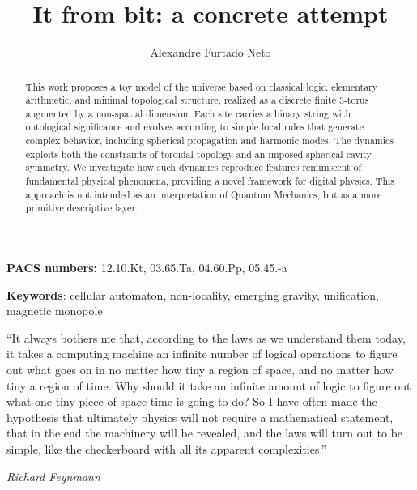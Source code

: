 \documentclass{ijuc}
\begin{document}
\title{It from bit: a concrete attempt}

\author{Alexandre Furtado Neto
}


\def\received{\today}

\maketitle

\begin{abstract}
\sloppy
This work proposes a toy model of the universe based on classical logic, elementary arithmetic, and minimal topological structure, realized as a discrete finite 3-torus augmented by a non-spatial dimension. Each site carries a binary string with ontological significance and evolves according to simple local rules that generate complex behavior, including spherical propagation and harmonic modes. The dynamics exploits both the constraints of toroidal topology and an imposed spherical cavity symmetry. We investigate how such dynamics reproduce features reminiscent of fundamental physical phenomena, providing a novel framework for digital physics. This approach is not intended as an interpretation of Quantum Mechanics, but as a more primitive descriptive layer.

\medskip{}
\end{abstract}

\vfill

\begin{center}
\textbf{PACS numbers: }12.10.Kt, 03.65.Ta, 04.60.Pp, 05.45.-a
\par\end{center}

\begin{center}
\textbf{Keywords}: cellular automaton, non-locality, emerging gravity, unification, magnetic monopole
\par\end{center}

\newpage


\epigraph{``It always bothers me that, according to the laws as we understand them today, it takes a computing machine an infinite number of logical operations to figure out what goes on in no matter how tiny a region of space, and no matter how tiny a region of time. Why should it take an infinite amount of logic to figure out what one tiny piece of space-time is going to do? So I have often made the hypothesis that ultimately physics will not require a mathematical statement, that in the end the machinery will be revealed, and the laws will turn out to be simple, like the checkerboard with all its apparent complexities.''}{\textit{Richard Feynmann}}
\end{document}
